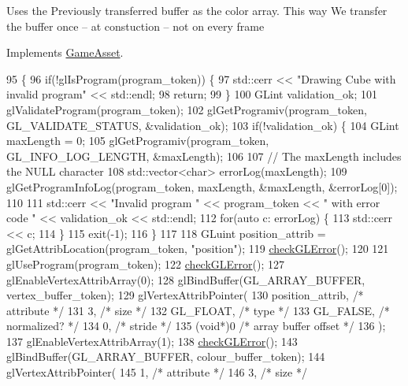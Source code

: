 Uses the Previously transferred buffer as the color array. This way We transfer the buffer once -- at constuction -- not on every frame

Implements \hyperlink{classGameAsset_a961aa51ca0a9961fc584c0b5d5431300}{Game\+Asset}.


\begin{DoxyCode}
95                                            \{
96   \textcolor{keywordflow}{if}(!glIsProgram(program\_token)) \{
97     std::cerr << \textcolor{stringliteral}{"Drawing Cube with invalid program"} << std::endl;
98     \textcolor{keywordflow}{return};
99   \}
100   GLint validation\_ok;
101   glValidateProgram(program\_token);
102   glGetProgramiv(program\_token, GL\_VALIDATE\_STATUS, &validation\_ok);
103   \textcolor{keywordflow}{if}(!validation\_ok) \{
104     GLint maxLength = 0;
105     glGetProgramiv(program\_token, GL\_INFO\_LOG\_LENGTH, &maxLength);
106 
107     \textcolor{comment}{// The maxLength includes the NULL character}
108     std::vector<char> errorLog(maxLength);
109     glGetProgramInfoLog(program\_token, maxLength, &maxLength, &errorLog[0]);
110 
111     std::cerr << \textcolor{stringliteral}{"Invalid program "} << program\_token << \textcolor{stringliteral}{" with error code "} << validation\_ok << std::endl;
112     \textcolor{keywordflow}{for}(\textcolor{keyword}{auto} c: errorLog) \{
113       std::cerr << c;
114     \}
115     exit(-1);
116   \}
117 
118   GLuint position\_attrib = glGetAttribLocation(program\_token, \textcolor{stringliteral}{"position"});
119   \hyperlink{GroundAsset_8cc_a75f201b0e53e68726854997957322b8d}{checkGLError}();
120 
121   glUseProgram(program\_token);
122   \hyperlink{GroundAsset_8cc_a75f201b0e53e68726854997957322b8d}{checkGLError}();
127   glEnableVertexAttribArray(0);
128   glBindBuffer(GL\_ARRAY\_BUFFER, vertex\_buffer\_token);
129   glVertexAttribPointer(
130     position\_attrib,        \textcolor{comment}{/* attribute */}
131     3,        \textcolor{comment}{/* size */}
132     GL\_FLOAT,   \textcolor{comment}{/* type */}
133     GL\_FALSE,   \textcolor{comment}{/* normalized? */}
134     0,        \textcolor{comment}{/* stride */}
135     (\textcolor{keywordtype}{void}*)0    \textcolor{comment}{/* array buffer offset */}
136   );
137   glEnableVertexAttribArray(1);
138   \hyperlink{GroundAsset_8cc_a75f201b0e53e68726854997957322b8d}{checkGLError}();
143   glBindBuffer(GL\_ARRAY\_BUFFER, colour\_buffer\_token);
144   glVertexAttribPointer(
145     1,        \textcolor{comment}{/* attribute */}
146     3,        \textcolor{comment}{/* size */}

\end{DoxyCode}
